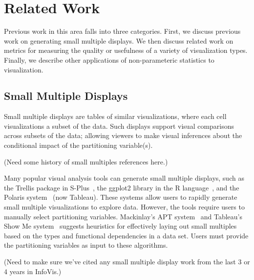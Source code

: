 \section{Related Work}
\label{sec:related}
Previous work in this area falls into three categories. First, we discuss previous work on generating small multiple displays. We then discuss related work on metrics for measuring the quality or usefulness of a variety of visualization types. Finally, we describe other applications of non-parameteric statistics to visualization.

\subsection{Small Multiple Displays}
Small multiple displays are tables of similar visualizations, where each cell visualizations a subset of the data. Such displays support visual comparisons across subsets of the data; allowing viewers to make visual inferences about the conditional impact of the partitioning variable(s).

(Need some history of small multiples references here.)

Many popular visual analysis tools can generate small multiple displays, such as the Trellis package in S-Plus~\cite{}, the ggplot2 library in the R language~\cite{Wickham2006}, and the Polaris system~\cite{Stolte2002} (now Tableau). These systems allow users to rapidly generate small multiple visualizations to explore data. However, the tools require users to manually select partitioning variables. Mackinlay's APT system~\cite{} and Tableau's Show Me system~\cite{mackinlay2007} suggests heuristics for effectively laying out small multiples based on the types and functional dependencies in a data set. Users must provide the partitioning variables as input to these algorithms. 


(Need to make sure we've cited any small multiple display work from the last 3 or 4 years in InfoVis.)


